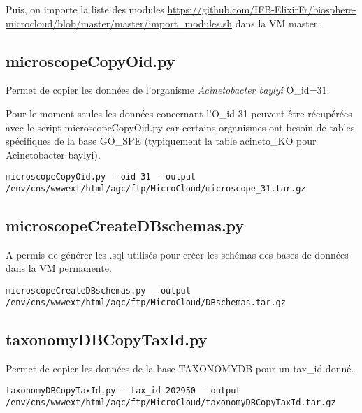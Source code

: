 Puis, on importe la liste des modules \url{https://github.com/IFB-ElixirFr/biosphere-microcloud/blob/master/master/import_modules.sh} dans la VM master.

\subsection{microscopeCopyOid.py}
Permet de copier les données de l'organisme \textit{Acinetobacter baylyi} O\_id=31. 

\begin{mycolorbox}
	Pour le moment seules les données concernant l'O\_id 31 peuvent être récupérées avec le script microscopeCopyOid.py car certains organismes ont besoin de tables spécifiques de la base GO\_SPE (typiquement la table acineto\_KO pour Acinetobacter baylyi).
\end{mycolorbox}

\begin{lstlisting}[style=bash]
microscopeCopyOid.py --oid 31 --output /env/cns/wwwext/html/agc/ftp/MicroCloud/microscope_31.tar.gz
\end{lstlisting}

\subsection{microscopeCreateDBschemas.py}
A permis de générer les .sql utilisés pour créer les schémas des bases de données dans la VM permanente.

\begin{lstlisting}[style=bash]
microscopeCreateDBschemas.py --output /env/cns/wwwext/html/agc/ftp/MicroCloud/DBschemas.tar.gz
\end{lstlisting}

\subsection{taxonomyDBCopyTaxId.py}
Permet de copier les données de la base TAXONOMYDB pour un tax\_id donné.

\begin{lstlisting}[style=bash]
taxonomyDBCopyTaxId.py --tax_id 202950 --output /env/cns/wwwext/html/agc/ftp/MicroCloud/taxonomyDBCopyTaxId.tar.gz
\end{lstlisting}